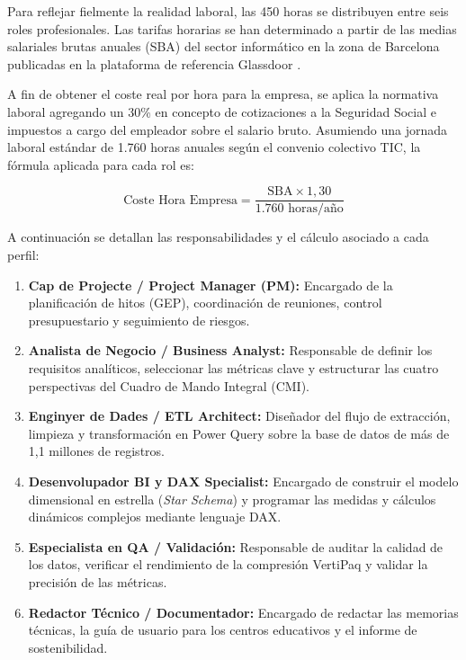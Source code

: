 \documentclass[12pt, a4paper, twoside]{report}
\begin{document}
Para reflejar fielmente la realidad laboral, las 450 horas se distribuyen entre seis roles profesionales. Las tarifas horarias se han determinado a partir de las medias salariales brutas anuales (SBA) del sector informático en la zona de Barcelona publicadas en la plataforma de referencia Glassdoor \cite{glassdoor_barcelona}.

A fin de obtener el coste real por hora para la empresa, se aplica la normativa laboral agregando un 30\% en concepto de cotizaciones a la Seguridad Social e impuestos a cargo del empleador sobre el salario bruto. Asumiendo una jornada laboral estándar de 1.760 horas anuales según el convenio colectivo TIC, la fórmula aplicada para cada rol es:

\begin{equation}
\text{Coste Hora Empresa} = \frac{\text{SBA} \times 1,30}{1.760 \text{ horas/año}}
\end{equation}

A continuación se detallan las responsabilidades y el cálculo asociado a cada perfil:
\begin{enumerate}
    \item \textbf{Cap de Projecte / Project Manager (PM):} Encargado de la planificación de hitos (GEP), coordinación de reuniones, control presupuestario y seguimiento de riesgos.
    \item \textbf{Analista de Negocio / Business Analyst:} Responsable de definir los requisitos analíticos, seleccionar las métricas clave y estructurar las cuatro perspectivas del Cuadro de Mando Integral (CMI).
    \item \textbf{Enginyer de Dades / ETL Architect:} Diseñador del flujo de extracción, limpieza y transformación en Power Query sobre la base de datos de más de 1,1 millones de registros.
    \item \textbf{Desenvolupador BI y DAX Specialist:} Encargado de construir el modelo dimensional en estrella (\textit{Star Schema}) y programar las medidas y cálculos dinámicos complejos mediante lenguaje DAX.
    \item \textbf{Especialista en QA / Validación:} Responsable de auditar la calidad de los datos, verificar el rendimiento de la compresión VertiPaq y validar la precisión de las métricas.
    \item \textbf{Redactor Técnico / Documentador:} Encargado de redactar las memorias técnicas, la guía de usuario para los centros educativos y el informe de sostenibilidad.
\end{enumerate}
\end{document}
